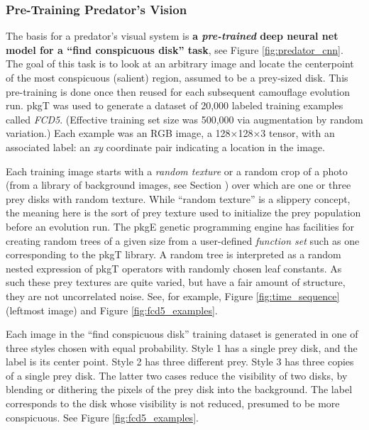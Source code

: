 \documentclass[letterpaper]{article}
\newcommand{\jargon}[1]{\textit{#1}}
\newcommand{\texsyn}[0]{pkgT}
\newcommand{\lazypredator}[0]{pkgE}
\begin{document}
\subsubsection{Pre-Training Predator's Vision}
\label{sec:pre_train_predator}
The basis for a predator's visual system is \textbf{a \jargon{pre-trained} deep neural net model for a “find conspicuous disk” task}, see Figure \ref{fig:predator_cnn}. The goal of this task is to look at an arbitrary image and locate the centerpoint of the most conspicuous (salient) region, assumed to be a prey-sized disk. This pre-training is done once then reused for each subsequent camouflage evolution run. \texsyn{} was used to generate a dataset of 20,000 labeled training examples called \jargon{FCD5}. (Effective training set size was 500,000 via augmentation by random variation.) Each example was an RGB image, a 128×128×3 tensor, with an associated label: an \textit{xy} coordinate pair indicating a location in the image.
\par
Each training image starts with a \jargon{random texture} or a random crop of a photo (from a library of background images, see Section ) over which are one or three prey disks with random texture. While “random texture” is a slippery concept, the meaning here is the sort of prey texture used to initialize the prey population before an evolution run. The \lazypredator{} genetic programming engine has facilities for creating random trees of a given size from a user-defined \jargon{function set} such as one corresponding to the \texsyn{} library. A random tree is interpreted as a random nested expression of \texsyn{} operators with randomly chosen leaf constants. As such these prey textures are quite varied, but have a fair amount of structure, they are not uncorrelated noise. See, for example, Figure \ref{fig:time_sequence} (leftmost image) and Figure \ref{fig:fcd5_examples}.
\par
Each image in the “find conspicuous disk” training dataset is generated in one of three styles chosen with equal probability. Style 1 has a single prey disk, and the label is its center point. Style 2 has three different prey. Style 3 has three copies of a single prey disk. The latter two cases reduce the visibility of two disks, by blending or dithering the pixels of the prey disk into the background. The label corresponds to the disk whose visibility is not reduced, presumed to be more conspicuous. See Figure \ref{fig:fcd5_examples}.
\par
\end{document}
